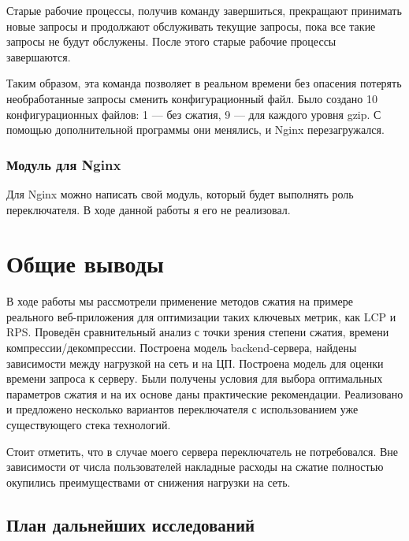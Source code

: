 \documentclass[12pt]{article}
\begin{document}
Старые рабочие процессы, получив команду завершиться, прекращают принимать новые запросы и продолжают обслуживать текущие запросы,
пока все такие запросы не будут обслужены. После этого старые рабочие процессы завершаются.

Таким образом, эта команда позволяет в реальном времени без опасения потерять необработанные запросы сменить конфигурационный файл.
Было создано 10 конфигурационных файлов: 1 — без сжатия, 9 — для каждого уровня gzip. С помощью дополнительной программы они менялись, и Nginx перезагружался.

\subsubsection{Модуль для Nginx}

Для Nginx можно написать свой модуль, который будет выполнять роль переключателя. В ходе данной работы я его не реализовал.

\section{Общие выводы}

В ходе работы мы рассмотрели применение методов сжатия на примере реального веб-приложения для оптимизации таких ключевых метрик, как LCP и RPS.
Проведён сравнительный анализ с точки зрения степени сжатия, времени компрессии/декомпрессии. Построена модель backend-сервера,
найдены зависимости между нагрузкой на сеть и на ЦП. Построена модель для оценки времени запроса к серверу.
Были получены условия для выбора оптимальных параметров сжатия и на их основе даны практические рекомендации.
Реализовано и предложено несколько вариантов переключателя с использованием уже существующего стека технологий.

Стоит отметить, что в случае моего сервера переключатель не потребовался. Вне зависимости от числа пользователей
накладные расходы на сжатие полностью окупились преимуществами от снижения нагрузки на сеть.

\subsection{План дальнейших исследований}
\end{document}
